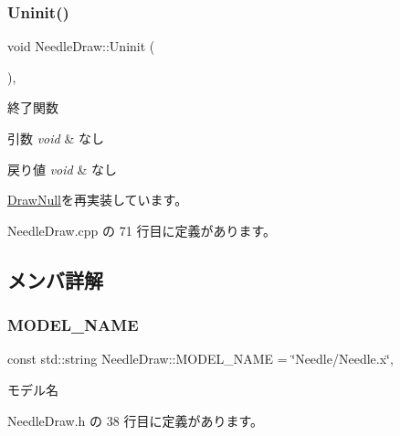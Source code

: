 \subsubsection{\texorpdfstring{Uninit()}{Uninit()}}
{\footnotesize\ttfamily void Needle\+Draw\+::\+Uninit (\begin{DoxyParamCaption}{ }\end{DoxyParamCaption})\hspace{0.3cm}{\ttfamily [override]}, {\ttfamily [virtual]}}



終了関数 


\begin{DoxyParams}{引数}
{\em void} & なし \\
\hline
\end{DoxyParams}

\begin{DoxyRetVals}{戻り値}
{\em void} & なし \\
\hline
\end{DoxyRetVals}


\mbox{\hyperlink{class_draw_null_a6e81d63efab7333e8d0e8af99362a4d9}{Draw\+Null}}を再実装しています。



 Needle\+Draw.\+cpp の 71 行目に定義があります。



\subsection{メンバ詳解}
\mbox{\label{class_needle_draw_a6b9fdc5c99ea8cb7e5d977b1e28d67a0}} 
\subsubsection{\texorpdfstring{M\+O\+D\+E\+L\+\_\+\+N\+A\+ME}{MODEL\_NAME}}
{\footnotesize\ttfamily const std\+::string Needle\+Draw\+::\+M\+O\+D\+E\+L\+\_\+\+N\+A\+ME = \char`\"{}Needle/Needle.\+x\char`\"{}\hspace{0.3cm}{\ttfamily [static]}, {\ttfamily [private]}}



モデル名 



 Needle\+Draw.\+h の 38 行目に定義があります。

